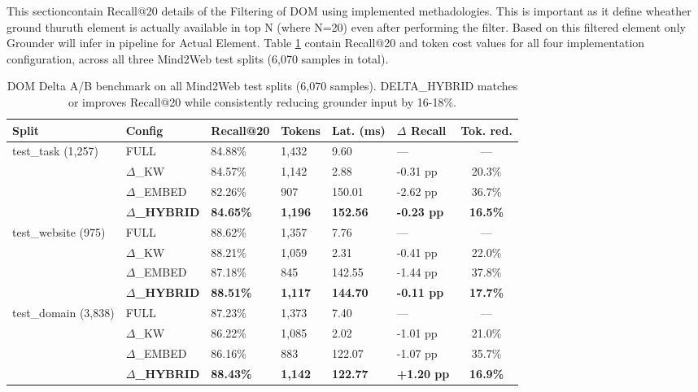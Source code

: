 This sectioncontain Recall@20 details of the Filtering of DOM using implemented methadologies. This is important as it define wheather ground thuruth element is actually available in top N (where N=20) even after performing the filter. Based on this filtered element only Grounder will infer in pipeline for Actual Element. Table \ref{tab:recall} contain Recall@20 and token cost values for all four implementation configuration, across all three Mind2Web test splits (6{,}070 samples in total).

\begin{table}[!h]
\footnotesize
\centering
\begin{tabularx}{\textwidth}{X|X|X|X|X|X|c}
\hline
\textbf{Split} & \textbf{Config} & \textbf{Recall@20} & \textbf{Tokens} & \textbf{Lat. (ms)} & \textbf{$\Delta$ Recall} & \textbf{Tok. red.} \\
\hline
test\_task (1{,}257)     & FULL & 84.88\% & 1{,}432 & 9.60 & --- & --- \\
                         & $\Delta$\_KW & 84.57\% & 1{,}142 & 2.88 & -0.31 pp & 20.3\% \\
                         & $\Delta$\_EMBED & 82.26\% & 907 & 150.01 & -2.62 pp & 36.7\% \\
                         & \textbf{$\Delta$\_HYBRID} & \textbf{84.65\%} & \textbf{1{,}196} & \textbf{152.56} & \textbf{-0.23 pp} & \textbf{16.5\%} \\
\hline
test\_website (975)      & FULL & 88.62\% & 1{,}357 & 7.76 & --- & --- \\
                         & $\Delta$\_KW & 88.21\% & 1{,}059 & 2.31 & -0.41 pp & 22.0\% \\
                         & $\Delta$\_EMBED & 87.18\% & 845 & 142.55 & -1.44 pp & 37.8\% \\
                         & \textbf{$\Delta$\_HYBRID} & \textbf{88.51\%} & \textbf{1{,}117} & \textbf{144.70} & \textbf{-0.11 pp} & \textbf{17.7\%} \\
\hline
test\_domain (3{,}838)   & FULL & 87.23\% & 1{,}373 & 7.40 & --- & --- \\
                         & $\Delta$\_KW & 86.22\% & 1{,}085 & 2.02 & -1.01 pp & 21.0\% \\
                         & $\Delta$\_EMBED & 86.16\% & 883 & 122.07 & -1.07 pp & 35.7\% \\
                         & \textbf{$\Delta$\_HYBRID} & \textbf{88.43\%} & \textbf{1{,}142} & \textbf{122.77} & \textbf{+1.20 pp} & \textbf{16.9\%} \\
\hline
\end{tabularx}
\caption{DOM Delta A/B benchmark on all Mind2Web test splits (6{,}070 samples). DELTA\_HYBRID matches or improves Recall@20 while consistently reducing grounder input by 16-18\%.}
\label{tab:recall}
\end{table}

